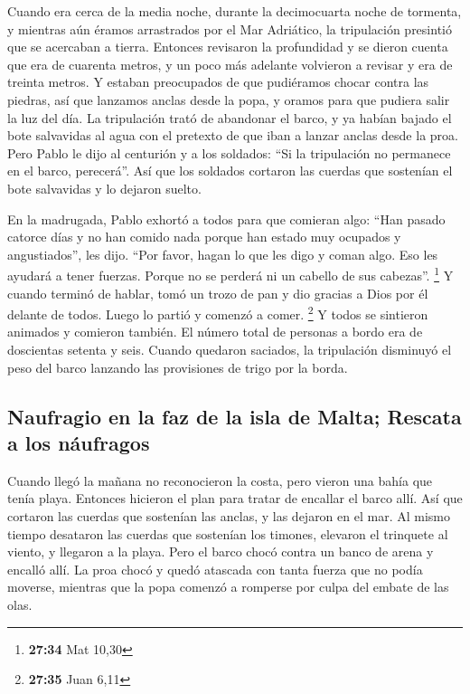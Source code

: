  Cuando era cerca de la media noche, durante la
decimocuarta noche de tormenta, y mientras aún éramos arrastrados por el
Mar Adriático, la tripulación presintió que se acercaban a tierra.
 Entonces revisaron la profundidad y se dieron cuenta que
era de cuarenta metros, y un poco más adelante volvieron a revisar y era
de treinta metros.  Y estaban preocupados de que
pudiéramos chocar contra las piedras, así que lanzamos anclas desde la
popa, y oramos para que pudiera salir la luz del día.  La
tripulación trató de abandonar el barco, y ya habían bajado el bote
salvavidas al agua con el pretexto de que iban a lanzar anclas desde la
proa.  Pero Pablo le dijo al centurión y a los soldados:
``Si la tripulación no permanece en el barco, perecerá''.
 Así que los soldados cortaron las cuerdas que sostenían
el bote salvavidas y lo dejaron suelto.

 En la madrugada, Pablo exhortó a todos para que comieran
algo: ``Han pasado catorce días y no han comido nada porque han estado
muy ocupados y angustiados'', les dijo.  ``Por favor,
hagan lo que les digo y coman algo. Eso les ayudará a tener fuerzas.
Porque no se perderá ni un cabello de sus cabezas''. \footnote{\textbf{27:34}
  Mat 10,30}  Y cuando terminó de hablar, tomó un trozo
de pan y dio gracias a Dios por él delante de todos. Luego lo partió y
comenzó a comer. \footnote{\textbf{27:35} Juan 6,11}  Y
todos se sintieron animados y comieron también.  El
número total de personas a bordo era de doscientas setenta y seis.
 Cuando quedaron saciados, la tripulación disminuyó el
peso del barco lanzando las provisiones de trigo por la borda.

\hypertarget{naufragio-en-la-faz-de-la-isla-de-malta-rescata-a-los-nuxe1ufragos}{%
\subsection{Naufragio en la faz de la isla de Malta; Rescata a los
náufragos}\label{naufragio-en-la-faz-de-la-isla-de-malta-rescata-a-los-nuxe1ufragos}}

 Cuando llegó la mañana no reconocieron la costa, pero
vieron una bahía que tenía playa. Entonces hicieron el plan para tratar
de encallar el barco allí.  Así que cortaron las cuerdas
que sostenían las anclas, y las dejaron en el mar. Al mismo tiempo
desataron las cuerdas que sostenían los timones, elevaron el trinquete
al viento, y llegaron a la playa.  Pero el barco chocó
contra un banco de arena y encalló allí. La proa chocó y quedó atascada
con tanta fuerza que no podía moverse, mientras que la popa comenzó a
romperse por culpa del embate de las olas.

